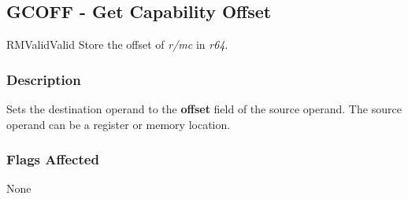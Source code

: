 \clearpage
{}
{}
\subsection*{GCOFF - Get Capability Offset}

\begin{x86opcodetable}
  {RM}{Valid}{Valid}
  {Store the offset of \emph{r/mc} in \emph{r64}.}
\end{x86opcodetable}

\begin{x86opentable}
\end{x86opentable}

\subsubsection*{Description}

Sets the destination operand to the \textbf{offset} field of the
source operand.  The source operand can be a register or memory
location.

\subsubsection*{Flags Affected}

None
